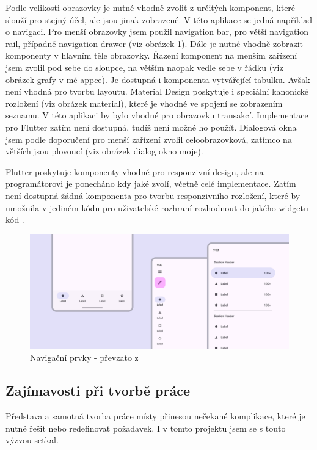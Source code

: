 \documentclass[
  biblatex,
  figures=true,
  tables=false,
  glossaries,
  index
]{kidiplom}
\begin{document}
Podle velikosti obrazovky je nutné vhodně zvolit z určitých komponent, které slouží pro stejný účel, ale jsou jinak zobrazené. V této aplikace se jedná například o navigaci. Pro menší obrazovky jsem použil navigation bar, pro větší navigation rail, případně navigation drawer (viz obrázek \ref{pic-navigation}). Dále je nutné vhodně zobrazit komponenty v hlavním těle obrazovky. Řazení komponent na menším zařízení jsem zvolil pod sebe do sloupce, na větším naopak vedle sebe v řádku (viz obrázek grafy v mé appce). Je dostupná i komponenta  vytvářející tabulku. Avšak není vhodná pro tvorbu layoutu. Material Design poskytuje i speciální kanonické rozložení (viz obrázek material), které je vhodné ve spojení se zobrazením seznamu. V této aplikaci by bylo vhodné pro obrazovku transakcí. Implementace pro Flutter zatím není dostupná, tudíž není možné ho použít. Dialogová okna jsem podle doporučení pro menší zařízení zvolil celoobrazovková, zatímco na větších jsou plovoucí (viz obrázek dialog okno moje).

Flutter poskytuje komponenty vhodné pro responzivní design, ale na programátorovi je ponecháno kdy jaké zvolí, včetně celé implementace. Zatím není dostupná žádná komponenta pro tvorbu responzivního rozložení, které by umožnila v jediném kódu pro uživatelské rozhraní rozhodnout do jakého widgetu kód .

\begin{figure}
  \centering 
  \includegraphics[width=\textwidth]{images/navigation1.png}
  \caption{Navigační prvky - převzato z \cite{layout-m3}}
  \label{pic-navigation}
\end{figure}

\subsection{Zajímavosti při tvorbě práce}
Představa a samotná tvorba práce místy přinesou nečekané komplikace, které je nutné řešit nebo redefinovat požadavek. I v tomto projektu jsem se s touto výzvou setkal.
\end{document}
